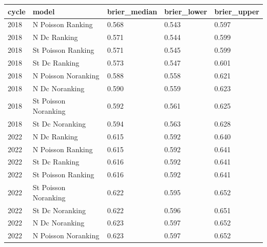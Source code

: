 \begin{tabular}{lllll}
\toprule
cycle & model & brier\_median & brier\_lower & brier\_upper \\
\midrule
2018 & N Poisson Ranking & 0.568 & 0.543 & 0.597 \\
2018 & N Dc Ranking & 0.571 & 0.544 & 0.599 \\
2018 & St Poisson Ranking & 0.571 & 0.545 & 0.599 \\
2018 & St Dc Ranking & 0.573 & 0.547 & 0.601 \\
2018 & N Poisson Noranking & 0.588 & 0.558 & 0.621 \\
2018 & N Dc Noranking & 0.590 & 0.559 & 0.623 \\
2018 & St Poisson Noranking & 0.592 & 0.561 & 0.625 \\
2018 & St Dc Noranking & 0.594 & 0.563 & 0.628 \\
2022 & N Dc Ranking & 0.615 & 0.592 & 0.640 \\
2022 & N Poisson Ranking & 0.615 & 0.592 & 0.641 \\
2022 & St Dc Ranking & 0.616 & 0.592 & 0.641 \\
2022 & St Poisson Ranking & 0.616 & 0.592 & 0.641 \\
2022 & St Poisson Noranking & 0.622 & 0.595 & 0.652 \\
2022 & St Dc Noranking & 0.622 & 0.596 & 0.651 \\
2022 & N Dc Noranking & 0.623 & 0.597 & 0.652 \\
2022 & N Poisson Noranking & 0.623 & 0.597 & 0.652 \\
\bottomrule
\end{tabular}
